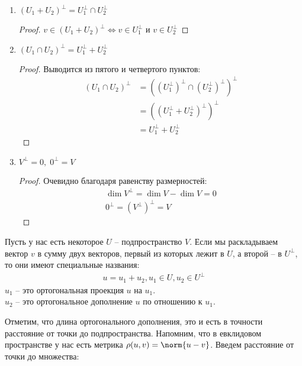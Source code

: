 \begin{theorem-non}
\begin{enumerate}
\begin{proof}
\begin{itemize}
                Раз размерности равны, и у нас есть одно включение, то получаем равенство.
            \end{itemize}
        \end{proof}
        \item $(U_1 + U_2)^\perp = U_1^\perp \cap U_2^\perp$
        \begin{proof}
            $v \in (U_1 + U_2)^\perp \Longleftrightarrow v \in U_1^\perp$ и $v \in U_2^\perp$
        \end{proof}
        \item $(U_1 \cap U_2)^\perp = U_1^\perp + U_2^\perp$
        \begin{proof}
            Выводится из пятого и четвертого пунктов: 
            \begin{align*}
                (U_1 \cap U_2)^\perp &= \left( (U_1^\perp)^\perp \cap (U_2^\perp)^\perp \right)^\perp \\
                &= \left( (U_1^\perp + U_2^\perp)^\perp \right)^\perp \\
                &= U_1^\perp + U_2^\perp  
            \end{align*}
        \end{proof}
        \item $V^\perp = 0, \; 0^\perp = V$
        \begin{proof}
            Очевидно благодаря равенству размерностей: 
            \begin{gather*}
                \dim{V^\perp} = \dim{V} - \dim{V} = 0 \\
                0^\perp = (V^\perp)^\perp = V
            \end{gather*}
        \end{proof}
    \end{enumerate}
\end{theorem-non}
\begin{conj}
    Пусть у нас есть некоторое $U$ -- подпространство $V$. 
    Если мы раскладываем вектор $v$ в сумму двух векторов, первый из которых лежит в $U$, а второй -- в $U^\perp$, то они имеют специальные 
    названия: 
    \begin{gather*}
        u = u_1 + u_2, u_1 \in U, u_2 \in U^\perp
    \end{gather*}
    $u_1$ -- это ортогональная проекция $u$ на $u_1$. \\
    $u_2$ -- это ортогональное дополнение $u$ по отношению к $u_1$.
\end{conj}

Отметим, что длина ортогонального дополнения, это и есть в точности расстояние от точки до подпространства. 
Напомним, что в евклидовом пространстве у нас есть метрика $\rho(u, v) = \norm{u - v}$. Введем расстояние от точки до множества:
    

